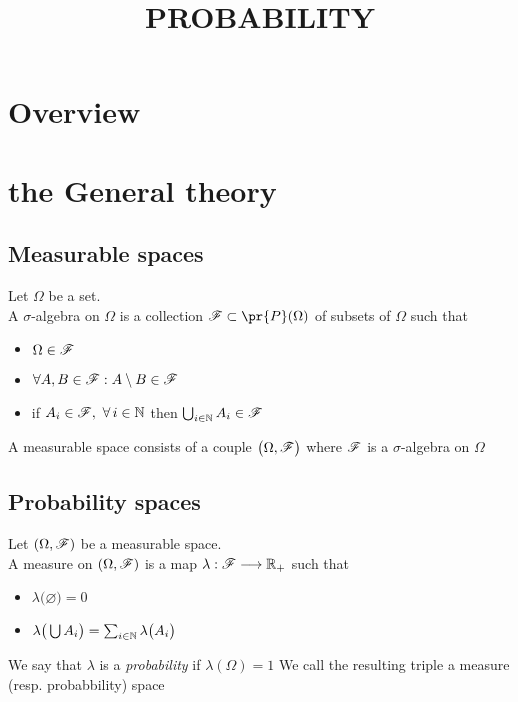 


\title{PROBABILITY}

\maketitle	


\noindent\hrulefill
\tableofcontents
\noindent\hrulefill

\label{section-phantom}

\section{Overview}


\section{the General theory}

\subsection{Measurable spaces}
\begin{definition}
Let $\Omega$ be a set.\\
A $\sigma$-algebra on $\Omega$ is a collection $\r{F}\subset \pr{P}(\Omega)$ of subsets of $\Omega$ such that
\begin{itemize}
\item $\Omega \in \r{F}$
\item $\forall A, B \in\r{F}: A\setminus B \in\r{F}$
\item if $A_i\in\r{F},\,\,\forall \,i \in \d{N}$ then $\bigcup_{i \in \d{N}} A_i \in \r{F}$
\end{itemize}
A measurable space consists of a couple $\big(\Omega,\r{F}\big)$ where $\r{F}$ is a $\sigma$-algebra on $\Omega$
\end{definition}

\subsection{Probability spaces}
\begin{definition}
Let $(\Omega,\r{F})$ be a measurable space.\\
A measure on $(\Omega,\r{F})$ is a map $\lambda:\r{F}\mor \d{R}_+$ such that 
\begin{itemize}
\item $\lambda\big(\varnothing) = 0$
\item $\lambda\big(\bigcup A_i\big) = \sum_{i \in \mathbb{N}} \lambda\big(A_i\big)$
\end{itemize}
We say that $\lambda$ is a \emph{probability} if $\lambda(\Omega)=1$
We call the resulting triple a measure (resp. probabbility) space


\end{definition}

